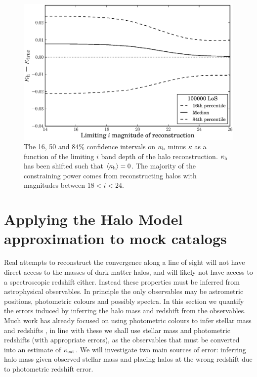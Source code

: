 \documentclass[useAMS,usenatbib]{mn2e}
\begin{document}
\begin{figure}
\includegraphics[width=\columnwidth]{figs/mag_scatter.eps}
\caption[magcut]{The 16, 50 and 84\% confidence intervals on $\kappa_{\rm h}$ minus $\kappa$ as a function of the limiting $i$ band depth of the halo reconstruction. $\kappa_{\rm h}$ has been shifted such that $\left\langle\kappa_{\rm h}\right\rangle=0$. The majority of the constraining power comes from reconstructing halos with magnitudes between $18<i<24$.}
\label{fig:magcut}
\end{figure}



\section{Applying the Halo Model approximation to mock catalogs}
\label{sec:obsMstar+z}

Real attempts to reconstruct the convergence along a line of sight will not have direct access to the masses of dark matter halos, 
and will likely not have access to a spectroscopic redshift either. Instead these properties must be inferred from astrophysical
observables. In principle the only observables may be astrometric positions, photometric colours and possibly spectra. In this section we
quantify the errors induced by inferring the halo mass and redshift from the observables. Much work has already focused on using
photometric colours to infer stellar mass \citep[\eg][]{AugerEtal2009} and redshifts \citep[\eg][]{BPZ}, in line with these we shall use
stellar mass and photometric redshifts (with appropriate errors), as the observables that must be converted into an estimate
of $\kappa_{\rm ext}$. We will investigate two main sources of error: inferring halo mass given observed stellar mass and placing halos at the wrong redshift due to photometric redshift error.
\end{document}
